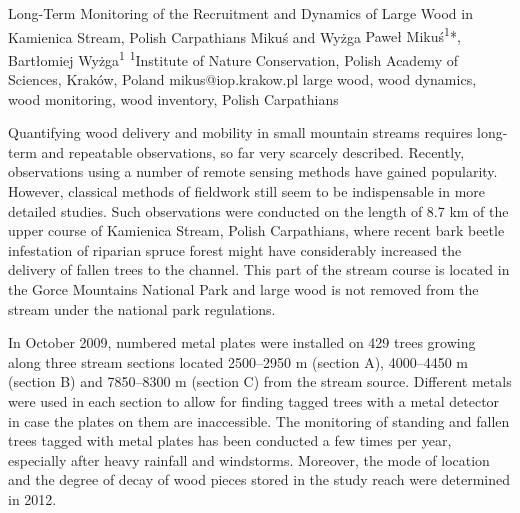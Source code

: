 \abstract
{Long-Term Monitoring of the Recruitment and Dynamics of Large Wood in Kamienica Stream, Polish Carpathians} %
{Mikuś and Wyżga} %
{Paweł Mikuś\textsuperscript{1}*, Bartłomiej Wyżga\textsuperscript{1}} %
{\TLtag} %
{\textsuperscript{1}Institute of Nature Conservation, Polish Academy of Sciences, Kraków, Poland
} %
{mikus@iop.krakow.pl}  %
{large wood, wood dynamics, wood monitoring, wood inventory, Polish Carpathians}%
{Quantifying wood delivery and mobility in small mountain streams requires long-term and repeatable observations, so far very scarcely described. Recently, observations using a number of remote sensing methods have gained popularity. However, classical methods of fieldwork still seem to be indispensable in more detailed studies. Such observations were conducted on the length of 8.7 km of the upper course of Kamienica Stream, Polish Carpathians, where recent bark beetle infestation of riparian spruce forest might have considerably increased the delivery of fallen trees to the channel. This part of the stream course is located in the Gorce Mountains National Park and large wood is not removed from the stream under the national park regulations.

In October 2009, numbered metal plates were installed on 429 trees growing along three stream sections located 2500–2950 m (section A), 4000–4450 m (section B) and 7850–8300 m (section C) from the stream source. Different metals were used in each section to allow for finding tagged trees with a metal detector in case the plates on them are inaccessible. The monitoring of standing and fallen trees tagged with metal plates has been conducted a few times per year, especially after heavy rainfall and windstorms. Moreover, the mode of location and the degree of decay of wood pieces stored in the study reach were determined in 2012.

}
